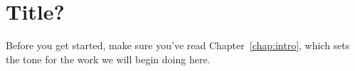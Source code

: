 \chapter{Title?}

Before you get started, make sure you've read Chapter~\ref{chap:intro}, which sets the tone for the work we will begin doing here.